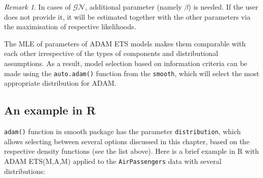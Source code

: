 \documentclass[
]{book}
\theoremstyle{definition}
\theoremstyle{definition}
\theoremstyle{definition}
\theoremstyle{definition}
\theoremstyle{remark}
\newtheorem*{remark}{Remark}
\begin{document}
\begin{remark}
In cases of \(\mathcal{GN}\), additional parameter (namely \(\beta\)) is needed. If the user does not provide it, it will be estimated together with the other parameters via the maximisation of respective likelihoods.
\end{remark}

The MLE of parameters of ADAM ETS models makes them comparable with each other irrespective of the types of components and distributional assumptions. As a result, model selection based on information criteria can be made using the \texttt{auto.adam()} function from the \texttt{smooth}, which will select the most appropriate distribution for ADAM.

\hypertarget{an-example-in-r-1}{%
\subsection{An example in R}\label{an-example-in-r-1}}

\texttt{adam()} function in smooth package has the parameter \texttt{distribution}, which allows selecting between several options discussed in this chapter, based on the respective density functions (see the list above). Here is a brief example in R with ADAM ETS(M,A,M) applied to the \texttt{AirPassengers} data with several distributions:
\end{document}
